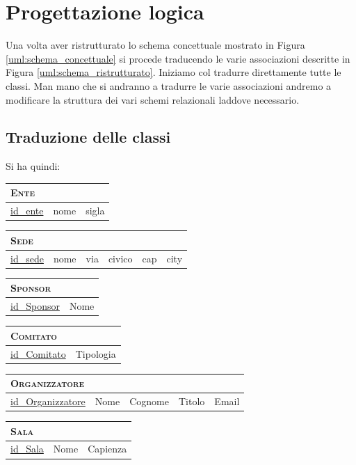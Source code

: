 \section{Progettazione logica}
Una volta aver ristrutturato lo schema concettuale mostrato in Figura \ref{uml:schema_concettuale} si procede traducendo le varie associazioni descritte in Figura \ref{uml:schema_ristrutturato}. Iniziamo col tradurre direttamente tutte le classi. Man mano che si andranno a tradurre le varie associazioni andremo a modificare la struttura dei vari schemi relazionali laddove necessario.
\subsection{Traduzione delle classi}
Si ha quindi:

	\begin{tabular}{|l|l|l|}
		\multicolumn{3}{l}{\textsc{Ente}}\\ \hline
		\underline{id\_ente} & nome & sigla \\ \hline
	\end{tabular}


	\begin{tabular}{|l|l|l|l|l|l|}
		\multicolumn{6}{l}{\textsc{Sede}} \\ \hline
		\underline{id\_sede} & nome & via & civico & cap & city \\ \hline
	\end{tabular}


	\begin{tabular}{|l|l|}
		\multicolumn{2}{l}{\textsc{Sponsor}} \\ \hline
		\underline{id\_Sponsor} & Nome \\ \hline
	\end{tabular}


	\begin{tabular}{|l|l|}
		\multicolumn{2}{l}{\textsc{Comitato}} \\ \hline
		\underline{id\_Comitato} & Tipologia \\ \hline
	\end{tabular}


	\begin{tabular}{|l|l|l|l|l|}
		\multicolumn{5}{l}{\textsc{Organizzatore}} \\ \hline
		\underline{id\_Organizzatore} & Nome & Cognome & Titolo & Email \\ \hline
	\end{tabular}


	\begin{tabular}{|l|l|l|}
		\multicolumn{3}{l}{\textsc{Sala}} \\ \hline
		\underline{id\_Sala} & Nome & Capienza \\ \hline
	\end{tabular}


